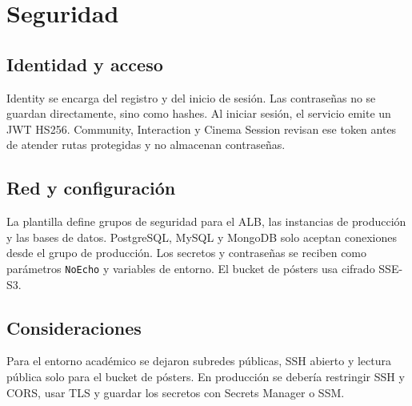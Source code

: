 ﻿\chapter{Seguridad}
\section{Identidad y acceso}
Identity se encarga del registro y del inicio de sesión. Las contraseñas no se guardan directamente, sino como hashes. Al iniciar sesión, el servicio emite un JWT HS256. Community, Interaction y Cinema Session revisan ese token antes de atender rutas protegidas y no almacenan contraseñas.
\section{Red y configuración}
La plantilla define grupos de seguridad para el ALB, las instancias de producción y las bases de datos. PostgreSQL, MySQL y MongoDB solo aceptan conexiones desde el grupo de producción. Los secretos y contraseñas se reciben como parámetros \texttt{NoEcho} y variables de entorno. El bucket de pósters usa cifrado SSE-S3.
\section{Consideraciones}
Para el entorno académico se dejaron subredes públicas, SSH abierto y lectura pública solo para el bucket de pósters. En producción se debería restringir SSH y CORS, usar TLS y guardar los secretos con Secrets Manager o SSM.
